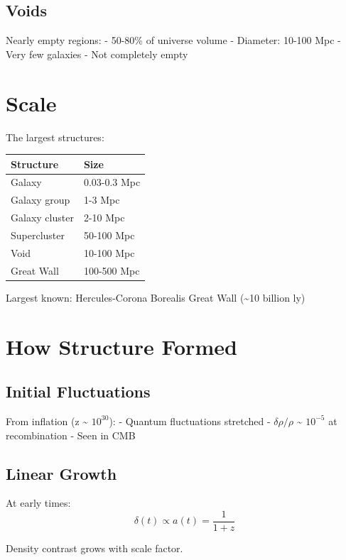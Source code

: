 \documentclass[
  11pt,
  letterpaper,
  twoside,
  openright]{book}
\begin{document}
\subsection{Voids}\label{voids}

Nearly empty regions: - 50-80\% of universe volume - Diameter: 10-100
Mpc - Very few galaxies - Not completely empty

\section{Scale}\label{scale}

The largest structures:

\begin{longtable}[]{@{}ll@{}}
\toprule\noalign{}
Structure & Size \\
\midrule\noalign{}
\endhead
\bottomrule\noalign{}
\endlastfoot
Galaxy & 0.03-0.3 Mpc \\
Galaxy group & 1-3 Mpc \\
Galaxy cluster & 2-10 Mpc \\
Supercluster & 50-100 Mpc \\
Void & 10-100 Mpc \\
Great Wall & 100-500 Mpc \\
\end{longtable}

Largest known: Hercules-Corona Borealis Great Wall (\textasciitilde10
billion ly)

\section{How Structure Formed}\label{how-structure-formed}

\subsection{Initial Fluctuations}\label{initial-fluctuations}

From inflation (z \textasciitilde{} \(10^{30}\)): - Quantum fluctuations
stretched - \(\delta\rho/\rho\) \textasciitilde{} \(10^{-5}\) at
recombination - Seen in CMB

\subsection{Linear Growth}\label{linear-growth}

At early times: \[
\delta(t) \propto a(t) = \frac{1}{1+z}
\]

Density contrast grows with scale factor.
\end{document}
